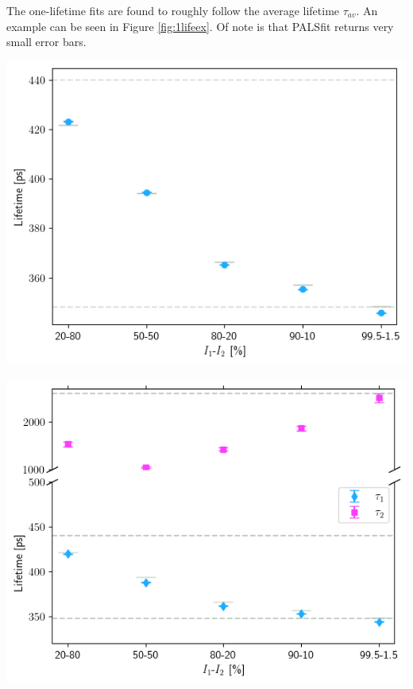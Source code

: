 The one-lifetime fits are found to roughly follow the average lifetime $\tau_{av}$. An example can be seen in Figure \ref{fig:1lifeex}. Of note is that PALSfit returns very small error bars. 

 
\begin{minipage}{.45\linewidth}
     
    \includegraphics[width=\linewidth]{Batch 7/348-440/output/1 life/lifetime.png}    
    \label{fig:1lifeex}
\end{minipage}
\hfill
\begin{minipage}{.45\linewidth}
     
    \includegraphics[width=\linewidth]{Batch 7/348-440/output/2 life/lifetimes.png}    
    \label{fig:2lifeex}
\end{minipage}
 

